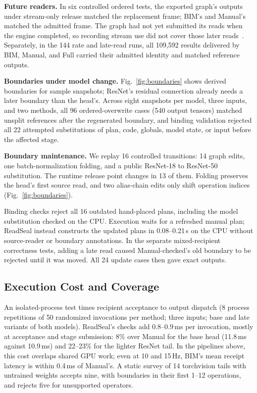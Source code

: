 \documentclass[conference]{IEEEtran}
\newcommand{\ms}{\,ms}
\newcommand{\Hz}{\,Hz}
\begin{document}
\textbf{Future readers.} In six controlled ordered tests, the exported graph's outputs under stream-only release matched the replacement frame; BIM's and Manual's matched the admitted frame. The graph had not yet submitted its reads when the engine completed, so recording stream use did not cover those later reads~\cite{recordstream}. Separately, in the 144 rate and late-read runs, all 109,592 results delivered by BIM, Manual, and Full carried their admitted identity and matched reference outputs.

\textbf{Boundaries under model change.} Fig.~\ref{fig:boundaries} shows derived boundaries for sample snapshots; ResNet's residual connection already needs a later boundary than the head's. Across eight snapshots per model, three inputs, and two methods, all 96 ordered-overwrite cases (540 output tensors) matched unsplit references after the regenerated boundary, and binding validation rejected all 22 attempted substitutions of plan, code, globals, model state, or input before the affected stage.

\textbf{Boundary maintenance.} We replay 16 controlled transitions: 14 graph edits, one batch-normalization folding, and a public ResNet-18 to ResNet-50 substitution. The runtime release point changes in 13 of them. Folding preserves the head's first source read, and two alias-chain edits only shift operation indices (Fig.~\ref{fig:boundaries}).

Binding checks reject all 16 outdated hand-placed plans, including the model substitution checked on the CPU. Execution waits for a refreshed manual plan; ReadSeal instead constructs the updated plans in 0.08--0.21\,s on the CPU without source-reader or boundary annotations. In the separate mixed-recipient correctness tests, adding a late read caused Manual-checked's old boundary to be rejected until it was moved. All 24 update cases then gave exact outputs.

\subsection{Execution Cost and Coverage}
\label{sec:eval-cost}

An isolated-process test times recipient acceptance to output dispatch (8 process repetitions of 50 randomized invocations per method; three inputs; base and late variants of both models). ReadSeal's checks add 0.8--0.9\ms{} per invocation, mostly at acceptance and stage submission: 8\% over Manual for the base head (11.8\ms{} against 10.9\ms) and 22--23\% for the lighter ResNet tail. In the pipelines above, this cost overlaps shared GPU work; even at 10 and 15\Hz, BIM's mean receipt latency is within 0.4\ms{} of Manual's. A static survey of 14 torchvision tails with untrained weights accepts nine, with boundaries in their first 1--12 operations, and rejects five for unsupported operators.
\end{document}
